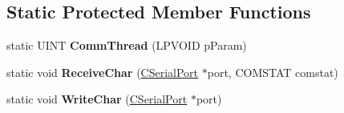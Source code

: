 \subsection*{Static Protected Member Functions}
\begin{DoxyCompactItemize}
\item 
\hypertarget{classCSerialPort_a961a364b7f313aca15558e3ca895fa15}{
static UINT {\bfseries CommThread} (LPVOID pParam)}
\label{classCSerialPort_a961a364b7f313aca15558e3ca895fa15}

\item 
\hypertarget{classCSerialPort_a9b6e1397f75a72d379fe7a77bd3018c4}{
static void {\bfseries ReceiveChar} (\hyperlink{classCSerialPort}{CSerialPort} $\ast$port, COMSTAT comstat)}
\label{classCSerialPort_a9b6e1397f75a72d379fe7a77bd3018c4}

\item 
\hypertarget{classCSerialPort_a7062a8930c4fd2f1e611a0324c5e55fc}{
static void {\bfseries WriteChar} (\hyperlink{classCSerialPort}{CSerialPort} $\ast$port)}
\label{classCSerialPort_a7062a8930c4fd2f1e611a0324c5e55fc}

\end{DoxyCompactItemize}
